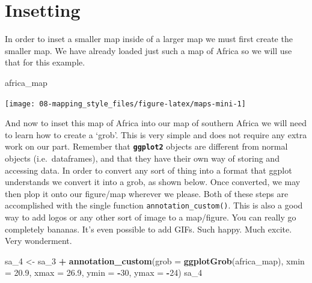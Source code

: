 \documentclass[]{book}
\newenvironment{Shaded}{\begin{snugshade}}{\end{snugshade}}
\newcommand{\KeywordTok}[1]{\textcolor[rgb]{0.13,0.29,0.53}{\textbf{#1}}}
\newcommand{\DataTypeTok}[1]{\textcolor[rgb]{0.13,0.29,0.53}{#1}}
\newcommand{\DecValTok}[1]{\textcolor[rgb]{0.00,0.00,0.81}{#1}}
\newcommand{\FloatTok}[1]{\textcolor[rgb]{0.00,0.00,0.81}{#1}}
\newcommand{\StringTok}[1]{\textcolor[rgb]{0.31,0.60,0.02}{#1}}
\newcommand{\OperatorTok}[1]{\textcolor[rgb]{0.81,0.36,0.00}{\textbf{#1}}}
\newcommand{\NormalTok}[1]{#1}
\theoremstyle{definition}
\theoremstyle{definition}
\theoremstyle{definition}
\theoremstyle{remark}
\begin{document}
\section{Insetting}\label{insetting}

In order to inset a smaller map inside of a larger map we must first
create the smaller map. We have already loaded just such a map of Africa
so we will use that for this example.

\begin{Shaded}
\begin{Highlighting}[]
\NormalTok{africa_map}
\end{Highlighting}
\end{Shaded}

\begin{center}\texttt{[image: 08-mapping\_style\_files/figure-latex/maps-mini-1]} \end{center}

And now to inset this map of Africa into our map of southern Africa we
will need to learn how to create a `grob'. This is very simple and does
not require any extra work on our part. Remember that
\textbf{\texttt{ggplot2}} objects are different from normal objects
(i.e.~dataframes), and that they have their own way of storing and
accessing data. In order to convert any sort of thing into a format that
ggplot understands we convert it into a grob, as shown below. Once
converted, we may then plop it onto our figure/map wherever we please.
Both of these steps are accomplished with the single function
\texttt{annotation\_custom()}. This is also a good way to add logos or
any other sort of image to a map/figure. You can really go completely
bananas. It's even possible to add GIFs. Such happy. Much excite. Very
wonderment.

\begin{Shaded}
\begin{Highlighting}[]
\NormalTok{sa_}\DecValTok{4}\NormalTok{ <-}\StringTok{ }\NormalTok{sa_}\DecValTok{3} \OperatorTok{+}
\StringTok{  }\KeywordTok{annotation_custom}\NormalTok{(}\DataTypeTok{grob =} \KeywordTok{ggplotGrob}\NormalTok{(africa_map),}
                    \DataTypeTok{xmin =} \FloatTok{20.9}\NormalTok{, }\DataTypeTok{xmax =} \FloatTok{26.9}\NormalTok{,}
                    \DataTypeTok{ymin =} \OperatorTok{-}\DecValTok{30}\NormalTok{, }\DataTypeTok{ymax =} \OperatorTok{-}\DecValTok{24}\NormalTok{)}
\NormalTok{sa_}\DecValTok{4}
\end{Highlighting}
\end{Shaded}
\end{document}
